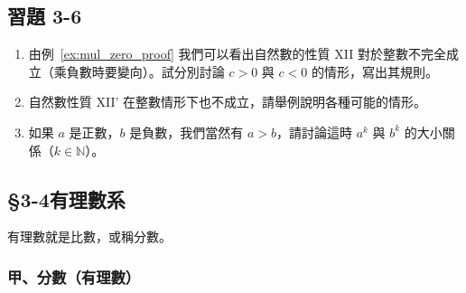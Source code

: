 \subsection*{習題 3-6}\label{sec:ex3-6}

\begin{enumerate}[1., leftmargin=2em]
  \item 由例~\ref{ex:mul_zero_proof} 我們可以看出自然數的性質 XII 對於整數不完全成立（乘負數時要變向）。試分別討論 $c > 0$ 與 $c < 0$ 的情形，寫出其規則。
  \item 自然數性質 XII' 在整數情形下也不成立，請舉例說明各種可能的情形。
  \item 如果 $a$ 是正數，$b$ 是負數，我們當然有 $a > b$，請討論這時 $a^k$ 與 $b^k$ 的大小關係（$k \in \mathbb{N}$）。
\end{enumerate}

\subsection{\S 3-4\quad 有理數系}\label{sec:3-4}

有理數就是比數，或稱分數。

\subsubsection*{甲、分數（有理數）}\label{subsec:fractions}

